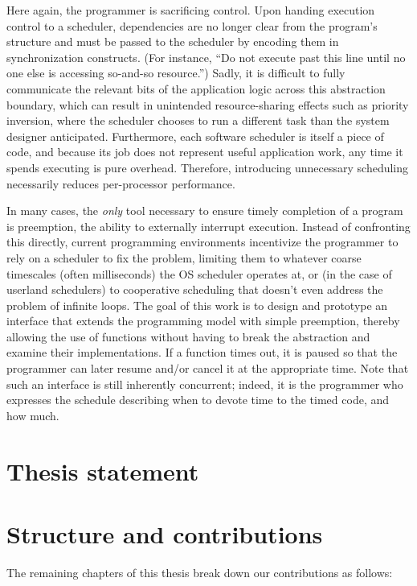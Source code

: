 Here again, the programmer is sacrificing control.  Upon handing execution control to
a scheduler, dependencies are no longer clear from the program's structure and must
be passed to the scheduler by encoding them in synchronization constructs.  (For
instance, ``Do not execute past this line until no one else is accessing so-and-so
resource.'')  Sadly,
it is difficult to fully communicate the relevant bits of the application logic
across this abstraction boundary, which can result in unintended resource-sharing
effects such as priority inversion, where the scheduler chooses to run a different
task than the system designer anticipated.  Furthermore, each software scheduler is
itself a
piece of code, and because its job does not represent useful application work, any
time it spends executing is pure overhead.  Therefore, introducing unnecessary
scheduling necessarily reduces per-processor performance.

In many cases, the \textit{only} tool necessary to ensure timely completion of a
program is preemption, the ability to externally interrupt execution.  Instead of
confronting this directly, current programming
environments incentivize the programmer to rely on a scheduler to fix the problem,
limiting them to whatever coarse timescales (often milliseconds) the OS scheduler
operates at, or (in the case of userland schedulers) to cooperative scheduling
that doesn't even address the problem of infinite loops.  The goal of this work is to
design and prototype an interface that extends the programming model with simple
preemption, thereby allowing the use of functions without having to break the
abstraction and examine their implementations.  If a function times out, it is
paused so that the programmer can later resume and/or cancel it at the appropriate
time.  Note that such an interface is still inherently concurrent; indeed, it is the
programmer who expresses the schedule describing when to devote time to the timed
code, and how much.


\section{Thesis statement}




\section{Structure and contributions}

The remaining chapters of this thesis break down our contributions as follows:

